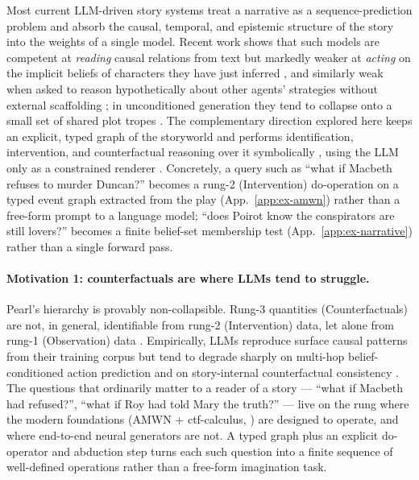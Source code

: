 \documentclass[11pt]{article}
\begin{document}
Most current LLM-driven story systems treat a narrative as a
sequence-prediction problem and absorb the causal, temporal, and
epistemic structure of the story into the weights of a single
model. Recent work shows that such models are competent at
\emph{reading} causal relations from text
\citep{kiciman2024causal} but markedly weaker at \emph{acting}
on the implicit beliefs of characters they have just inferred
\citep{gu2026simpletom,kim2023fantom}, and similarly weak when
asked to reason hypothetically about other agents' strategies
without external scaffolding \citep{cross2024hyp}; in
unconditioned generation they tend to collapse onto a small set
of shared plot tropes \citep{xu2025echoes,tian2024human}. The
complementary direction explored here keeps an explicit, typed
graph of the storyworld
\citep{schank1977scripts,mani2012computational,elson2012sig} and
performs identification, intervention, and counterfactual
reasoning over it symbolically
\citep{pearl2009causality,halpern2016actual,correa2025amwn},
using the LLM only as a constrained renderer
\citep{riedlyoung2010narrative,yao2019planwrite,
goldfarbtarrant2020aristotelian,yang2023doc}. Concretely, a
query such as ``what if Macbeth refuses to murder Duncan?'' becomes
a rung-2 (Intervention) do-operation on a typed event graph extracted from the
play (App.~\ref{app:ex-amwn}) rather than a free-form prompt to
a language model; ``does Poirot know the conspirators are still
lovers?'' becomes a finite belief-set membership test
(App.~\ref{app:ex-narrative}) rather than a single forward pass.

\paragraph{Motivation 1: counterfactuals are where LLMs tend to
struggle.} Pearl's hierarchy is provably non-collapsible. Rung-3
quantities (Counterfactuals) are not, in general, identifiable from rung-2
(Intervention) data, let alone from rung-1 (Observation) data
\citep{bareinboim2022pearl}.
Empirically, LLMs reproduce surface causal patterns from their
training corpus \citep{kiciman2024causal} but tend to degrade
sharply on multi-hop belief-conditioned action prediction
\citep{kim2023fantom,gu2026simpletom} and on story-internal
counterfactual consistency \citep{xu2025echoes}. The questions
that ordinarily matter to a reader of a story --- ``what if
Macbeth had refused?'', ``what if Roy had told Mary the truth?''
--- live on the rung where the modern foundations (AMWN +
ctf-calculus, \citealp{correa2025amwn}) are designed to operate,
and where end-to-end neural generators are not. A typed graph
plus an explicit do-operator and abduction step turns each such
question into a finite sequence of well-defined operations
\citep{pearl2009causality,halpern2005causes,halpern2016actual}
rather than a free-form imagination task.
\end{document}
